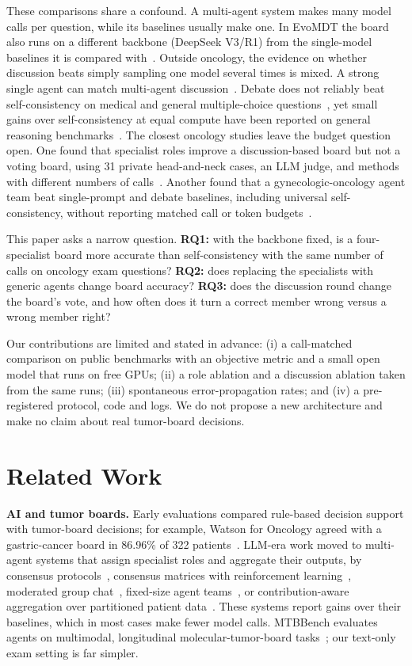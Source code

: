 \IfFileExists{IEEEtran.cls}{\documentclass[conference]{IEEEtran}}{\documentclass[10pt,twocolumn]{article}\usepackage[margin=0.75in]{geometry}}
\begin{document}
These comparisons share a confound. A multi-agent system makes many model calls per question, while its baselines usually make one. In EvoMDT the board also runs on a different backbone (DeepSeek V3/R1) from the single-model baselines it is compared with~\cite{liu2025evomdt}. Outside oncology, the evidence on whether discussion beats simply sampling one model several times is mixed. A strong single agent can match multi-agent discussion~\cite{wang2024rethinking}. Debate does not reliably beat self-consistency on medical and general multiple-choice questions~\cite{smit2023mad}, yet small gains over self-consistency at equal compute have been reported on general reasoning benchmarks~\cite{wunderlich2026pareto}. The closest oncology studies leave the budget question open. One found that specialist roles improve a discussion-based board but not a voting board, using 31 private head-and-neck cases, an LLM judge, and methods with different numbers of calls~\cite{kim2025mlhc}. Another found that a gynecologic-oncology agent team beat single-prompt and debate baselines, including universal self-consistency, without reporting matched call or token budgets~\cite{kuerbanjiang2025mdat}.

This paper asks a narrow question. \textbf{RQ1:} with the backbone fixed, is a four-specialist board more accurate than self-consistency with the same number of calls on oncology exam questions? \textbf{RQ2:} does replacing the specialists with generic agents change board accuracy? \textbf{RQ3:} does the discussion round change the board's vote, and how often does it turn a correct member wrong versus a wrong member right?

Our contributions are limited and stated in advance: (i) a call-matched comparison on public benchmarks with an objective metric and a small open model that runs on free GPUs; (ii) a role ablation and a discussion ablation taken from the same runs; (iii) spontaneous error-propagation rates; and (iv) a pre-registered protocol, code and logs. We do not propose a new architecture and make no claim about real tumor-board decisions.

\section{Related Work}
\textbf{AI and tumor boards.} Early evaluations compared rule-based decision support with tumor-board decisions; for example, Watson for Oncology agreed with a gastric-cancer board in 86.96\% of 322 patients~\cite{park2024fidelity}. LLM-era work moved to multi-agent systems that assign specialist roles and aggregate their outputs, by consensus protocols~\cite{liu2025evomdt}, consensus matrices with reinforcement learning~\cite{han2025consensus}, moderated group chat~\cite{kim2025mlhc}, fixed-size agent teams~\cite{kuerbanjiang2025mdat}, or contribution-aware aggregation over partitioned patient data~\cite{wu2026comma}. These systems report gains over their baselines, which in most cases make fewer model calls. MTBBench evaluates agents on multimodal, longitudinal molecular-tumor-board tasks~\cite{vasilev2025mtbbench}; our text-only exam setting is far simpler.
\end{document}
